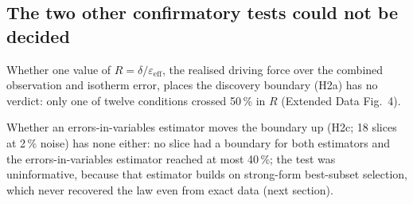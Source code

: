 \documentclass[11pt]{article}
\begin{document}
\subsection*{The two other confirmatory tests could not be decided}
Whether one value of $R = \delta/\varepsilon_{\mathrm{eff}}$, the realised driving force over the
combined observation and isotherm error, places the discovery boundary (H2a) has no verdict: only one of
twelve conditions crossed 50\,\% in $R$ (Extended Data Fig.~4).

Whether an errors-in-variables
estimator moves the boundary up (H2c; 18 slices at 2\,\% noise) has none either: no slice had a
boundary for both estimators and the errors-in-variables estimator reached at most 40\,\%;
the test was uninformative, because that estimator builds on strong-form best-subset selection,
which never recovered the law even from exact data (next section).
\end{document}
